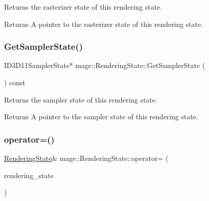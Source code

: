Returns the rasterizer state of this rendering state.

\begin{DoxyReturn}{Returns}
A pointer to the rasterizer state of this rendering state. 
\end{DoxyReturn}
\hypertarget{structmage_1_1_rendering_state_a72a0817f0041d49af156f8115347460d}{}\label{structmage_1_1_rendering_state_a72a0817f0041d49af156f8115347460d} 
\subsubsection{\texorpdfstring{Get\+Sampler\+State()}{GetSamplerState()}}
{\footnotesize\ttfamily I\+D3\+D11\+Sampler\+State$\ast$ mage\+::\+Rendering\+State\+::\+Get\+Sampler\+State (\begin{DoxyParamCaption}{ }\end{DoxyParamCaption}) const\hspace{0.3cm}{\ttfamily [noexcept]}}

Returns the sampler state of this rendering state.

\begin{DoxyReturn}{Returns}
A pointer to the sampler state of this rendering state. 
\end{DoxyReturn}
\hypertarget{structmage_1_1_rendering_state_af03ad38dd9b88949fc9d3603e4829c26}{}\label{structmage_1_1_rendering_state_af03ad38dd9b88949fc9d3603e4829c26} 
\subsubsection{\texorpdfstring{operator=()}{operator=()}\hspace{0.1cm}{\footnotesize\ttfamily [1/2]}}
{\footnotesize\ttfamily \hyperlink{structmage_1_1_rendering_state}{Rendering\+State}\& mage\+::\+Rendering\+State\+::operator= (\begin{DoxyParamCaption}\item[{const \hyperlink{structmage_1_1_rendering_state}{Rendering\+State} \&}]{rendering\+\_\+state }\end{DoxyParamCaption})\hspace{0.3cm}{\ttfamily [delete]}}

